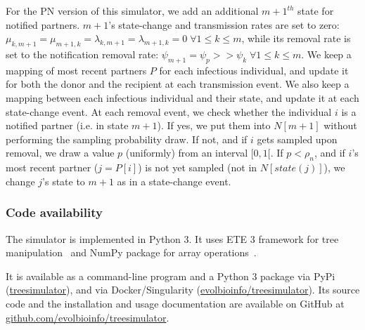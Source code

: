 \documentclass[a4paper,10pt]{article}
\begin{document}
For the PN version of this simulator, we add an additional $m+1^{th}$ state for notified partners. $m + 1$'s state-change and transmission rates are set to zero: $\mu_{k,m+1} = \mu_{m+1,k} = \lambda_{k,m+1} = \lambda_{m+1,k} = 0\; \forall 1 \leq k \leq m$, while its removal rate is set to the notification removal rate: $\psi_{m+1} = \psi_p >> \psi_k\; \forall 1 \leq k \leq m$. We keep a mapping of most recent partners $P$ for each infectious individual, and update it for both the donor and the recipient at each transmission event. We also keep a mapping between each infectious individual and their state, and update it at each state-change event. At each removal event, we check whether the individual $i$ is a notified partner (i.e. in state $m+1$). If yes, we put them into $N[m+1]$ without performing the sampling probability draw. If not, and if $i$ gets sampled upon removal, we draw a value $p$ (uniformly) from an interval $[0, 1[$. If $p < \rho_n$, and if $i$'s most recent partner ($j = P[i]$) is not yet sampled (not in $N[state(j)]$), we change $j$'s state to $m + 1$ as in a state-change event.


\subsubsection*{Code availability}
The simulator is implemented in Python 3. It uses ETE 3 framework for tree manipulation~\citep{Huerta-Cepas2016} and NumPy package for array operations~\citep{harris_array_2020}. 

It is available as a command-line program and a Python 3 package via PyPi (\href{https://pypi.org/project/treesimulator}{treesimulator}), and via Docker/Singularity (\href{https://hub.docker.com/r/evolbioinfo/treesimulator/tags}{evolbioinfo/treesimulator}). Its source code and the installation and usage documentation are available on GitHub at \href{https://github.com/evolbioinfo/treesimulator}{github.com/evolbioinfo/treesimulator}.
\end{document}
